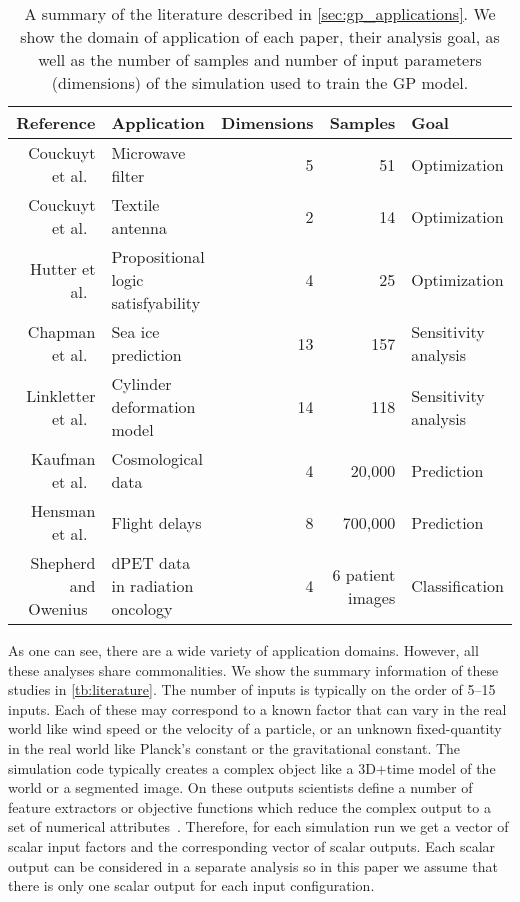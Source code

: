 \begin{table*}[htb]
\centering
\caption{
  A summary of the literature described in \autoref{sec:gp_applications}.  We
  show the domain of application of each paper, their analysis goal, as
  well as the number of samples and number of input parameters (dimensions)
  of the simulation used to train the GP model. 
}
\begin{tabular}{|r|lrrl|}
  \hline
  Reference & Application & Dimensions & Samples & Goal \\
  \hline
  Couckuyt et al.~\cite{Couckuyt:2010} & Microwave filter & 5 & 51 & Optimization \\
  Couckuyt et al.~\cite{Couckuyt:2010} & Textile antenna & 2 & 14 & Optimization \\
  Hutter et al.~\cite{Hutter:2010} & Propositional logic satisfyability & 4 & 25 & Optimization \\
  Chapman et al.~\cite{Chapman:1994} & Sea ice prediction & 13 & 157 & Sensitivity analysis \\
  Linkletter et al.~\cite{Linkletter:2006} & Cylinder deformation model & 14 & 118 & Sensitivity analysis \\
  Kaufman et al.~\cite{Kaufman:2011} & Cosmological data  & 4 & 20,000 & Prediction \\
  Hensman et al.~\cite{Hensman:2013} & Flight delays & 8 & 700,000 & Prediction \\
  Shepherd and Owenius~\cite{Shepherd:2012} & dPET data in radiation oncology & 4 & 6 patient images & Classification \\
  \hline
\end{tabular}
\label{tb:literature}
\end{table*}

As one can see, there are a wide variety of application domains.  However, 
all these analyses share commonalities.
We show the summary information of these studies in \autoref{tb:literature}.
The number of inputs is typically on
the order of 5--15 inputs. Each of these may correspond to a known factor that
can vary in the real world like wind speed or the velocity of a particle, or
an unknown fixed-quantity in the real world like Planck's constant or the
gravitational constant.  The simulation code typically creates a complex
object like a 3D+time model of the world or a segmented image. On these
outputs scientists define a number of feature extractors or objective
functions which reduce the complex output to a set of numerical 
attributes~\cite{Sedlmair:2014}.
Therefore, for each simulation run we get a vector of scalar input factors and
the corresponding vector of scalar outputs.  Each scalar output can be
considered in a separate analysis so in this paper we assume that there is
only one scalar output for each input configuration.

